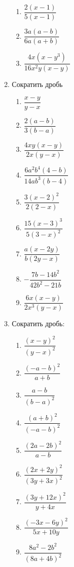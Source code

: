 \documentclass[12pt, a4paper]{article}
\begin{document}
\begin{enumerate}
\begin{multicols}{3}
\begin{enumerate}
			\item $\dfrac{2(x-1)}{5(x-1)}$ 
			\item $\dfrac{3a(a-b)}{6a(a+b)}$ 
			\item $\dfrac{4x(x-y^3)}{16x^2y(x-y)}$ 
		\end{enumerate}
	\end{multicols}
\item Сократить дробь
\begin{multicols}{3}
	\begin{enumerate}
		\item $\dfrac{x-y}{y-x}$ 
		\item $\dfrac{2(a-b)}{3(b-a)}$ 
		\item $\dfrac{4xy(x-y)}{2x(y-x)}$
		\item $\dfrac{6a^2b^4(4-b)}{14ab^3(b-4)}$ 
		\item $\dfrac{3(x-2)^2}{2(2-x)}$ 
		\item $\dfrac{15(x-3)^3}{5(3-x)^2}$ 
		\item $\dfrac{a(x-2y)}{b(2y-x)}$
		\item $-\dfrac{7b-14b^2}{42b^2-21b}$ 
		\item $\dfrac{6x(x-y)}{2x^3(y-x)}$
	\end{enumerate}	
\end{multicols}
\item Сократить дробь:
\begin{multicols}{3}
	\begin{enumerate}
		\item $\dfrac{(x-y)^2}{(y-x)^2}$
		\item $\dfrac{(-a-b)^2}{a+b}$
		\item $\dfrac{a-b}{(b-a)^2}$
		\item $\dfrac{(a+b)^2}{(-a-b)^2}$
		\item $\dfrac{(2a-2b)^2}{a-b}$
		\item $\dfrac{(2x+2y)^2}{(3y+3x)^2}$
		\item $\dfrac{(3y+12x)^2}{y+4x}$ 
		\item $\dfrac{(-3x-6y)^2}{5x+10y}$ 
		\item $\dfrac{8a^2-2b^2}{(8a+4b)^2}$ 
	\end{enumerate}	
\end{multicols}
\end{enumerate}
\end{document}
